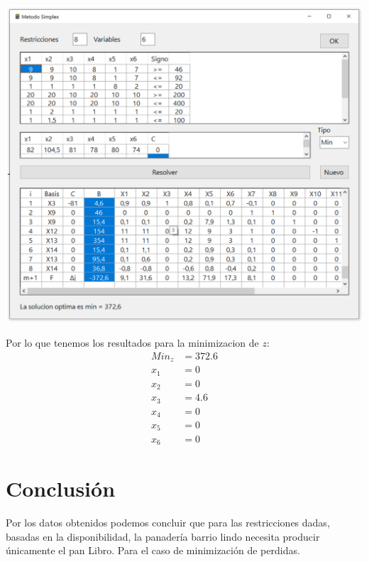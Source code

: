 \documentclass[10pt,letterpaper]{book}
\begin{document}
\begin{center}
\includegraphics[scale=0.55]{Programa7}
\end{center}
Por lo que tenemos los resultados para la minimizacion de $z$:
\begin{align*}
Min_z &= 372.6 \\ 
x_1   &= 0  \\
x_2   &= 0  \\
x_3   &= 4.6  \\
x_4   &= 0  \\
x_5   &= 0  \\
x_6   &= 0  
\end{align*}

\section*{Conclusión}
Por los datos obtenidos podemos concluir que para las restricciones dadas, basadas en la disponibilidad, la panadería barrio lindo necesita producir únicamente el pan Libro. Para el caso de minimización de perdidas.
\end{document}
